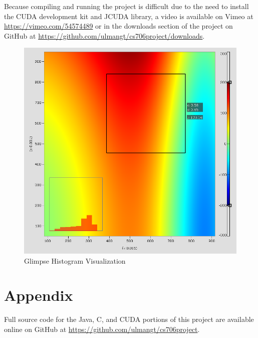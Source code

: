 \documentclass{article}
\begin{document}
Because compiling and running the project is difficult due to the need to install the CUDA development kit and JCUDA library, a video is available on Vimeo at \url{https://vimeo.com/54574489} or in the downloads section of the project on GitHub at \url{https://github.com/ulmangt/cs706project/downloads}.

\begin{figure}
\centering
\includegraphics[width=1.0\textwidth]{screenshots/glimpse/GlimpseHistogramPlot.png}
\caption{Glimpse Histogram Visualization}
\label{histogram1}
\end{figure}

\section{Appendix}\label{appendix}

Full source code for the Java, C, and CUDA portions of this project are available online on GitHub at \url{https://github.com/ulmangt/cs706project}.



\end{document}
